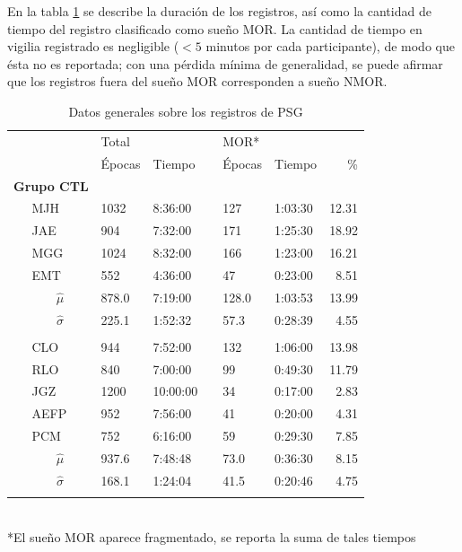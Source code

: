 \documentclass[12pt,letterpaper,draft]{book}
\newcommand{\ppu}{\phantom{1}}
\newcommand{\bordes}[1]{\renewcommand{\arraystretch}{#1}}
\newcommand{\midrulec}{%
  \arrayrulecolor{gris}\specialrule{\aboverulesep}{0pt}{0pt}
  \arrayrulecolor{black}\specialrule{\lightrulewidth}{0pt}{\belowrulesep}
}
\newcommand{\bottomrulec}{%
  \arrayrulecolor{black}
  \arrayrulecolor{gris}\specialrule{\belowrulesep}{0pt}{0pt}
  \arrayrulecolor{black}\specialrule{\lightrulewidth}{0pt}{\belowrulesep}
}
\begin{document}
En la tabla \ref{tab:psg} se describe la duración de los registros, así como la cantidad de tiempo del registro clasificado como sueño MOR.
%
La cantidad de tiempo en vigilia registrado es negligible ($<5$ minutos por cada participante), de modo que ésta no es reportada; con una pérdida mínima de generalidad, se puede afirmar que los registros fuera del sueño MOR corresponden a sueño NMOR.

\begin{table}
\centering
\caption{Datos generales sobre los registros de PSG}
\bordes{1.2}
\begin{tabular}{llllcllr}
\toprule
    \phantom{mmm}&
    & \multicolumn{2}{l}{Total} & \phantom{l}   & \multicolumn{3}{l}{MOR*}\\
    \cmidrule{3-4}  \cmidrule{6-8}
    &          &Épocas  &  Tiempo   &&Épocas  &  Tiempo   &  \% \\
\midrule
\multicolumn{2}{l}{\textbf{Grupo CTL}}\\
&MJH &    1032   &      8:36:00  &&    127   &   1:03:30 &12.31 \\
&JAE &\ppu 904   &      7:32:00  &&    171   &   1:25:30 &18.92 \\
&MGG &    1024   &      8:32:00  &&    166   &   1:23:00 &16.21 \\
&EMT &\ppu 552   &      4:36:00  &&\ppu 47   &   0:23:00 & 8.51 \\
 
\rowcolor{gris}
&\multicolumn{1}{c}{$\widehat{\mu}$}  
     &\ppu 878.0 &      7:19:00 &&    128.0 &   1:03:53&13.99 \\
\rowcolor{gris}
&\multicolumn{1}{c}{$\widehat{\sigma}$} 
     &\ppu 225.1 &      1:52:32 &&\ppu 57.3  &   0:28:39&4.55 \\ 
\midrulec

\multicolumn{2}{l}{\textbf{Grupo PDC}}\\
&CLO  &\ppu 944   &\ppu 7:52:00 &&    132   &   1:06:00 & 13.98 \\
&RLO  &\ppu 840   &\ppu 7:00:00 &&\ppu 99   &   0:49:30 & 11.79 \\
&JGZ  &    1200   &    10:00:00 &&\ppu 34   &   0:17:00 &  2.83 \\
&AEFP &\ppu 952   &\ppu 7:56:00 &&\ppu 41   &   0:20:00 &  4.31 \\
&PCM  &\ppu 752   &\ppu 6:16:00 &&\ppu 59   &   0:29:30 &  7.85 \\
 
\rowcolor{gris}
&\multicolumn{1}{c}{$\widehat{\mu}$}  
      &\ppu 937.6 &\ppu 7:48:48 &&\ppu 73.0 &   0:36:30 & 8.15 \\
\rowcolor{gris}
&\multicolumn{1}{c}{$\widehat{\sigma}$} 
      &\ppu 168.1 &\ppu 1:24:04 &&\ppu 41.5 &   0:20:46 & 4.75 \\
\bottomrulec
\end{tabular}\\
*El sueño MOR aparece fragmentado, se reporta la suma de tales tiempos
\label{tab:psg}
\end{table}
\end{document}
